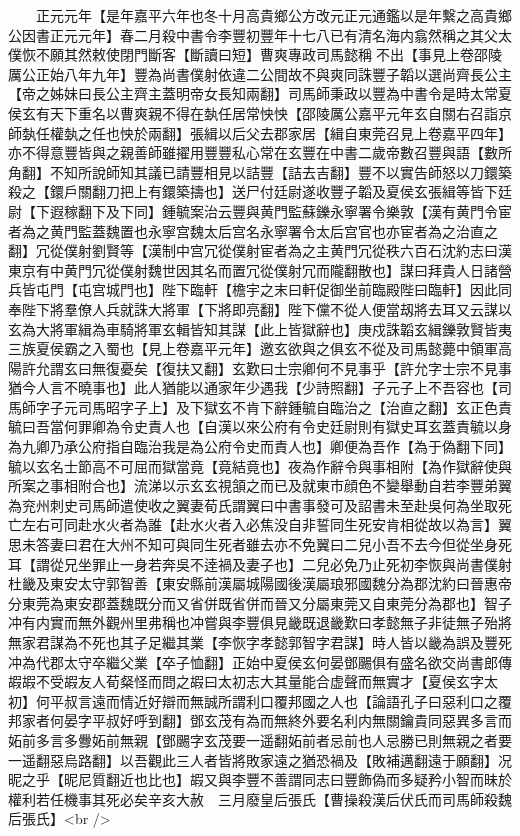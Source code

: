 　　正元元年【是年嘉平六年也冬十月高貴鄉公方改元正元通鑑以是年繫之高貴鄉公因書正元元年】春二月殺中書令李豐初豐年十七八已有清名海内翕然稱之其父太僕恢不願其然敕使閉門斷客【斷讀曰短】曹爽專政司馬懿稱不出【事見上卷邵陵厲公正始八年九年】豐為尚書僕射依違二公間故不與爽同誅豐子韜以選尚齊長公主【帝之姊妹曰長公主齊主蓋明帝女長知兩翻】司馬師秉政以豐為中書令是時太常夏侯玄有天下重名以曹爽親不得在埶任居常怏怏【邵陵厲公嘉平元年玄自關右召詣京師埶任權埶之任也怏於兩翻】張緝以后父去郡家居【緝自東莞召見上卷嘉平四年】亦不得意豐皆與之親善師雖擢用豐豐私心常在玄豐在中書二歲帝數召豐與語【數所角翻】不知所說師知其議已請豐相見以詰豐【詰去吉翻】豐不以實告師怒以刀鐶築殺之【鐶戶關翻刀把上有鐶築擣也】送尸付廷尉遂收豐子韜及夏侯玄張緝等皆下廷尉【下遐稼翻下及下同】鍾毓案治云豐與黄門監蘇鑠永寧署令樂敦【漢有黄門令宦者為之黄門監蓋魏置也永寧宫魏太后宫名永寧署令太后宫官也亦宦者為之治直之翻】冗從僕射劉賢等【漢制中宫冗從僕射宦者為之主黄門冗從秩六百石沈約志曰漢東京有中黄門冗從僕射魏世因其名而置冗從僕射冗而隴翻散也】謀曰拜貴人日諸營兵皆屯門【屯宫城門也】陛下臨軒【檐宇之末曰軒促御坐前臨殿陛曰臨軒】因此同奉陛下將羣僚人兵就誅大將軍【下將即亮翻】陛下儻不從人便當刼將去耳又云謀以玄為大將軍緝為車騎將軍玄輯皆知其謀【此上皆獄辭也】庚戍誅韜玄緝鑠敦賢皆夷三族夏侯霸之入蜀也【見上卷嘉平元年】邀玄欲與之俱玄不從及司馬懿薨中領軍高陽許允謂玄曰無復憂矣【復扶又翻】玄歎曰士宗卿何不見事乎【許允字士宗不見事猶今人言不曉事也】此人猶能以通家年少遇我【少詩照翻】子元子上不吾容也【司馬師字子元司馬昭字子上】及下獄玄不肯下辭鍾毓自臨治之【治直之翻】玄正色責毓曰吾當何罪卿為令史責人也【自漢以來公府有令史廷尉則有獄史耳玄蓋責毓以身為九卿乃承公府指自臨治我是為公府令史而責人也】卿便為吾作【為于偽翻下同】毓以玄名士節高不可屈而獄當竟【竟結竟也】夜為作辭令與事相附【為作獄辭使與所案之事相附合也】流涕以示玄玄視頷之而已及就東市顔色不變舉動自若李豐弟翼為兖州刺史司馬師遣使收之翼妻荀氏謂翼曰中書事發可及詔書未至赴吳何為坐取死亡左右可同赴水火者為誰【赴水火者入必焦没自非誓同生死安肯相從故以為言】翼思未答妻曰君在大州不知可與同生死者雖去亦不免翼曰二兒小吾不去今但從坐身死耳【謂從兄坐罪止一身若奔吳不逹禍及妻子也】二兒必免乃止死初李恢與尚書僕射杜畿及東安太守郭智善【東安縣前漢屬城陽國後漢屬琅邪國魏分為郡沈約曰晉惠帝分東莞為東安郡蓋魏既分而又省併既省併而晉又分屬東莞又自東莞分為郡也】智子冲有内實而無外觀州里弗稱也冲嘗與李豐俱見畿既退畿歎曰孝懿無子非徒無子殆將無家君謀為不死也其子足繼其業【李恢字孝懿郭智字君謀】時人皆以畿為誤及豐死冲為代郡太守卒繼父業【卒子恤翻】正始中夏侯玄何晏鄧颺俱有盛名欲交尚書郎傳嘏嘏不受嘏友人荀粲怪而問之嘏曰太初志大其量能合虚聲而無實才【夏侯玄字太初】何平叔言遠而情近好辯而無誠所謂利口覆邦國之人也【論語孔子曰惡利口之覆邦家者何晏字平叔好呼到翻】鄧玄茂有為而無終外要名利内無關鑰貴同惡異多言而妬前多言多釁妬前無親【鄧颺字玄茂要一遥翻妬前者忌前也人忌勝已則無親之者要一遥翻惡烏路翻】以吾觀此三人者皆將敗家遠之猶恐禍及【敗補邁翻遠于願翻】况昵之乎【昵尼質翻近也比也】嘏又與李豐不善謂同志曰豐飾偽而多疑矜小智而昧於權利若任機事其死必矣辛亥大赦　三月廢皇后張氏【曹操殺漢后伏氏而司馬師殺魏后張氏】<br />
